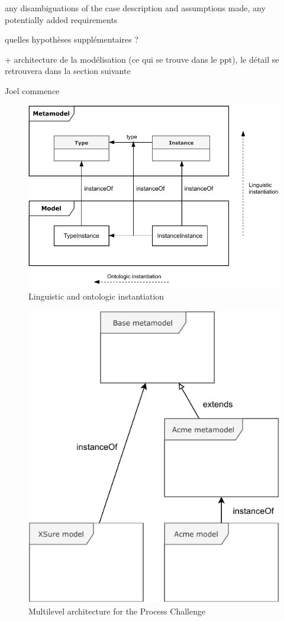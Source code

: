 any disambiguations of the  case  description and assumptions made, any potentially added requirements

quelles hypothèses supplémentaires ? 

+ architecture de la modélisation (ce qui se trouve dans le ppt), le détail se retrouvera dans la section suivante

Joel commence


\begin{figure}
    \centering
    \includegraphics[width=1.0 \columnwidth]{Figures/Instantiation.pdf}
    \caption{Linguistic and ontologic instantiation}
    \label{fig:LinguisticAndOntologicInstantiation}
\end{figure}

\begin{figure}
    \centering
    \includegraphics[width=0.7 \columnwidth]{Figures/MultilevelArchitecture.pdf}
    \caption{Multilevel architecture for the Process Challenge}
    \label{fig:MultilevelArchitecture}
\end{figure}


